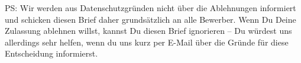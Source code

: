 PS: Wir werden aus Datenschutzgründen nicht über die Ablehnungen informiert und schicken diesen
Brief daher grundsätzlich an alle Bewerber. Wenn Du Deine Zulassung ablehnen willst, kannst Du diesen Brief
ignorieren -- Du würdest uns allerdings sehr helfen, wenn du uns
kurz per E-Mail über die Gründe für diese Entscheidung informierst.

